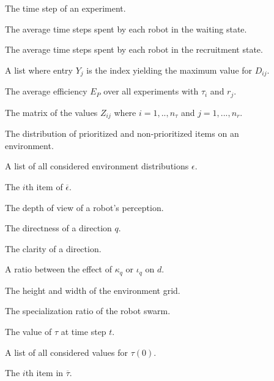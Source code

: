 \begin{description}
	\item[\parbox{\namewidth}{$t$}] The time step of an experiment.	

			
	\item[\parbox{\namewidth}{$t_{wait}$}] The average time steps spent by each robot in the waiting state.
	
	\item[\parbox{\namewidth}{$t_{recruitment}$}] The average time steps spent by each robot in the recruitment state. 

	\item[\parbox{\namewidth}{$Y$}] A list where entry $Y_j$ is the index yielding the maximum value for $D_{ij}$.

	\item[\parbox{\namewidth}{$Z_{ij}$}] The average efficiency $E_P$ over all experiments with $\tau_i$ and $r_j$.
	
	\item[\parbox{\namewidth}{$Z$}] The matrix of the values $Z_{ij}$ where $i=1,..,n_\tau$ and $j=1,...,n_r$.
	

	\item[\parbox{\namewidth}{$\epsilon$}] The distribution of prioritized and non-prioritized items on an environment.
	
	\item[\parbox{\namewidth}{$\overline{\epsilon}$}] A list of all considered environment distributions $\epsilon$.
	
	\item[\parbox{\namewidth}{$\epsilon_i$}] The $i$th item of $\overline{\epsilon}$.
	
	\item[\parbox{\namewidth}{$\eta$}] The depth of view of a robot's perception.

	\item[\parbox{\namewidth}{$\iota_q$}] The directness of a direction $q$.

	\item[\parbox{\namewidth}{$\kappa_q$}] The clarity of a direction.

	\item[\parbox{\namewidth}{$\lambda$}] A ratio between the effect of $\kappa_q$ or $\iota_q$ on $d$.
	
	\item[\parbox{\namewidth}{$\Lambda$}] The height and width of the environment grid.


	\item[\parbox{\namewidth}{$\tau$}] The specialization ratio of the robot swarm.

	\item[\parbox{\namewidth}{$\tau(t)$}] The value of $\tau$ at time step $t$.

	\item[\parbox{\namewidth}{$\overline{\tau}$}] A list of all considered values for $\tau(0)$.

	\item[\parbox{\namewidth}{$\tau_i(0)$}] The $i$th item in $\overline{\tau}$.

\end{description}

